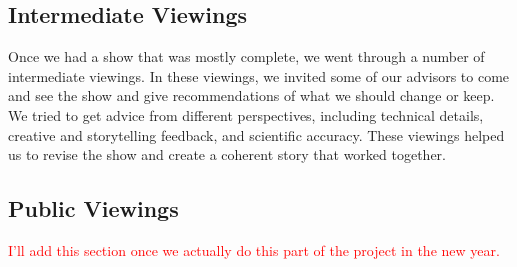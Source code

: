 \subsection{Intermediate Viewings}
Once we had a show that was mostly complete, we went through a number of intermediate viewings. In these viewings, we invited some of our advisors to come and see the show and give recommendations of what we should change or keep. We tried to get advice from different perspectives, including technical details, creative and storytelling feedback, and scientific accuracy. These viewings helped us to revise the show and create a coherent story that worked together. 

\subsection{Public Viewings}
\textcolor{red}{I'll add this section once we actually do this part of the project in the new year.}